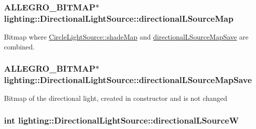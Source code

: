 \subsubsection[{\texorpdfstring{directional\+L\+Source\+Map}{directionalLSourceMap}}]{\setlength{\rightskip}{0pt plus 5cm}A\+L\+L\+E\+G\+R\+O\+\_\+\+B\+I\+T\+M\+AP$\ast$ lighting\+::\+Directional\+Light\+Source\+::directional\+L\+Source\+Map\hspace{0.3cm}{\ttfamily [protected]}}\hypertarget{classlighting_1_1DirectionalLightSource_afc3f2e73813a6d9c035aa0d58ad5d37c}{}\label{classlighting_1_1DirectionalLightSource_afc3f2e73813a6d9c035aa0d58ad5d37c}


Bitmap where \hyperlink{classlighting_1_1CircleLightSource_a382414c9318853e93c85bc64bcd19f4e}{Circle\+Light\+Source\+::shade\+Map} and \hyperlink{classlighting_1_1DirectionalLightSource_a021658da101e47c909858b2c17d387ff}{directional\+L\+Source\+Map\+Save} are combined. 

\subsubsection[{\texorpdfstring{directional\+L\+Source\+Map\+Save}{directionalLSourceMapSave}}]{\setlength{\rightskip}{0pt plus 5cm}A\+L\+L\+E\+G\+R\+O\+\_\+\+B\+I\+T\+M\+AP$\ast$ lighting\+::\+Directional\+Light\+Source\+::directional\+L\+Source\+Map\+Save\hspace{0.3cm}{\ttfamily [protected]}}\hypertarget{classlighting_1_1DirectionalLightSource_a021658da101e47c909858b2c17d387ff}{}\label{classlighting_1_1DirectionalLightSource_a021658da101e47c909858b2c17d387ff}


Bitmap of the directional light, created in constructor and is not changed 

\subsubsection[{\texorpdfstring{directional\+L\+SourceW}{directionalLSourceW}}]{\setlength{\rightskip}{0pt plus 5cm}int lighting\+::\+Directional\+Light\+Source\+::directional\+L\+SourceW\hspace{0.3cm}{\ttfamily [protected]}}\hypertarget{classlighting_1_1DirectionalLightSource_af4372a31b5f7938c18723f53265922e7}{}\label{classlighting_1_1DirectionalLightSource_af4372a31b5f7938c18723f53265922e7}


